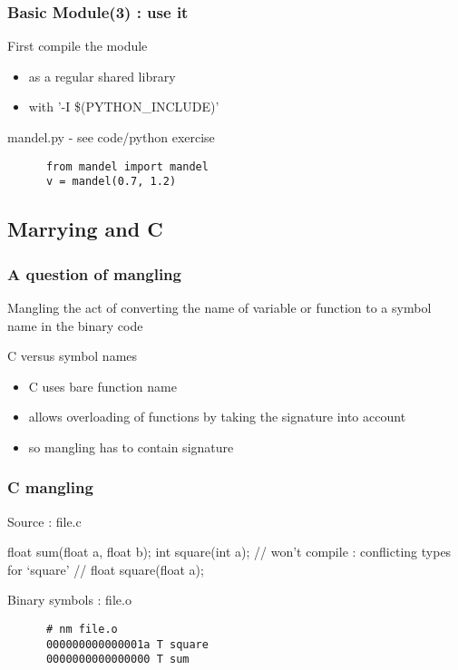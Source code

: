 \begin{frame}[fragile]
  \frametitle{Basic Module(3) : use it}
  \begin{block}{First compile the module}
    \begin{itemize}
    \item as a regular shared library
    \item with '-I \$(PYTHON\_INCLUDE)'
    \end{itemize}
  \end{block}
  \begin{block}{mandel.py - see code/python exercise}
    \begin{verbatim}
      from mandel import mandel
      v = mandel(0.7, 1.2)
    \end{verbatim}
  \end{block}
\end{frame}


\subsection[C]{Marrying \cpp and C}

\begin{frame}[fragile]
  \frametitle{A question of mangling}
  \begin{block}{Mangling}
    the act of converting the name of variable or function to a symbol name in the binary code
  \end{block}
  \begin{block}{C versus \cpp symbol names}
    \begin{itemize}
    \item C uses bare function name
    \item \cpp allows overloading of functions by taking the signature into account
    \item so \cpp mangling has to contain signature
    \end{itemize}
  \end{block}
\end{frame}

\begin{frame}[fragile]
  \frametitle{C mangling}
  \begin{exampleblock}{Source : file.c}
    \begin{cppcode*}{}
      float sum(float a, float b);
      int square(int a);
      // won't compile : conflicting types for ‘square’
      // float square(float a);
    \end{cppcode*}
  \end{exampleblock}
  \begin{block}{Binary symbols : file.o}
    \begin{verbatim}
      # nm file.o
      000000000000001a T square
      0000000000000000 T sum
    \end{verbatim}
  \end{block}  
\end{frame}

